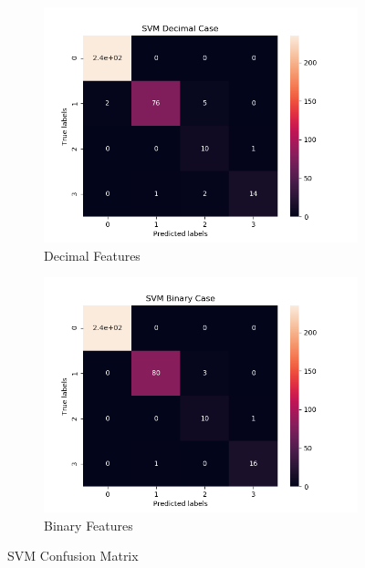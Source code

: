 \begin{figure}[H]
     \centering
     \hspace*{\fill}
     \begin{subfigure}[b]{0.35\textwidth}
         \centering
         \includegraphics[width=\textwidth]{../Figures/SVM Decimal Case_conf_mat.png}
         \caption{Decimal Features}
     \end{subfigure}
     \hfill
     \begin{subfigure}[b]{0.35\textwidth}
         \centering
         \includegraphics[width=\textwidth]{../Figures/SVM Binary Case_conf_mat.png}
         \caption{Binary Features}
     \end{subfigure}
     \hspace*{\fill}
     \caption{SVM Confusion Matrix}
\end{figure}